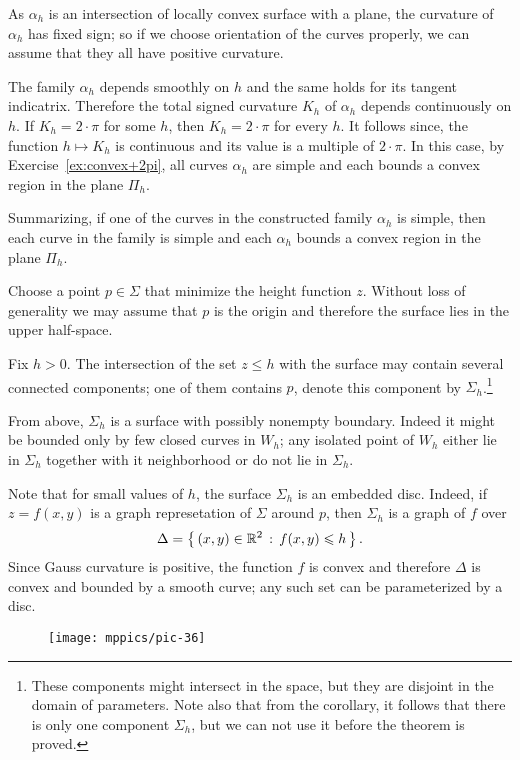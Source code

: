 As $\alpha_h$ is an intersection of locally convex surface with a plane,
the curvature of $\alpha_h$ has fixed sign;
so if we choose orientation of the curves properly, we can assume that they all have positive curvature.

The family $\alpha_h$ depends smoothly on $h$ and the same holds for its tangent indicatrix.
Therefore the total signed curvature $K_h$ of $\alpha_h$ depends continuously on $h$.
If $K_h=2\cdot\pi$ for some $h$, then $K_h=2\cdot\pi$ for every $h$.
It follows since, the function $h\mapsto K_h$ is continuous and its value is a multiple of $2\cdot\pi$.
In this case, by Exercise~\ref{ex:convex+2pi}, all curves $\alpha_h$ are simple and each bounds a convex region in the plane $\Pi_h$.

Summarizing, if one of the curves in the constructed family $\alpha_{h}$ is simple,
then each curve in the family is simple and each $\alpha_{h}$ bounds a convex region in the plane $\Pi_h$. 

Choose a point $p\in \Sigma$ that minimize the height function $z$.
Without loss of generality we may assume that $p$ is the origin and therefore the surface lies in the upper half-space.

Fix $h>0$.
The intersection of the set $z\le h$ with the surface may contain several connected components;
one of them contains $p$, denote this component by $\Sigma_h$.\footnote{These components might intersect in the space, but they are disjoint in the domain of parameters. Note also that from the corollary, it follows that there is only one component $\Sigma_h$, but we can not use it before the theorem is proved.}


From above, $\Sigma_h$ is a surface with possibly nonempty boundary.
Indeed it might be bounded only by few closed curves in $W_h$;
any isolated point of $W_h$ either lie in $\Sigma_h$ together with it neighborhood or do not lie in $\Sigma_h$.


Note that for small values of $h$, the surface $\Sigma_h$ is an embedded disc.
Indeed, if $z=f(x,y)$ is a graph represetation of $\Sigma$ around $p$,
then $\Sigma_h$ is a graph of $f$ over 
\[\Delta=\left\{\,{(x,y)\in\mathbb{R}^2}\,:\,{f(x,y)\leqslant h}\,\right\}.\]
Since Gauss curvature is positive, the function $f$ is convex and therefore $\Delta$ is convex and bounded by a smooth curve;
any such set can be parameterized by a disc.

\begin{wrapfigure}{r}{30 mm}
\vskip-0mm
\centering
\texttt{[image: mppics/pic-36]}
\vskip-0mm
\end{wrapfigure}

